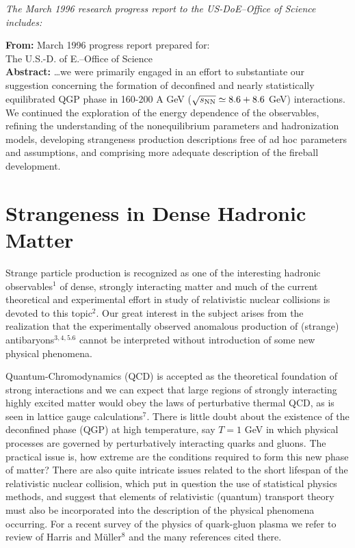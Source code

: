 \noindent\textit{The March 1996 research progress report to the  US-DoE--Office of Science includes:}\\[-0.7cm]
%
\begin{mdframed}[linecolor=gray,roundcorner=12pt,backgroundcolor=Dandelion!15,linewidth=1pt,leftmargin=0cm,rightmargin=0cm,topline=true,bottomline=true,skipabove=12pt]\relax%
%
{\large \textbf{From:} March 1996 progress report prepared for:}\\ 
\indent\indent\indent  The U.S.-D. of E.--Office of Science\\
\textbf{Abstract:} \ldots we were primarily  engaged in an effort to substantiate our suggestion concerning the  formation of deconfined and nearly statistically equilibrated QGP phase in 160-200 A GeV  ($\sqrt{s_{\rm NN}}\simeq 8.6 + 8.6$ GeV) interactions. We continued the exploration of the energy dependence of the observables, refining the understanding of the nonequilibrium parameters and hadronization models, developing strangeness production descriptions free of ad hoc parameters and assumptions, and comprising more adequate  description of the fireball development. 
% 
\section*{Strangeness in Dense Hadronic Matter} 
Strange particle production is  recognized as one of the interesting hadronic observables$^1$ of dense, strongly interacting matter and much of the current theoretical and experimental effort in study of relativistic nuclear collisions is devoted to  this topic$^2$. Our great interest in the subject arises from the realization that the experimentally observed anomalous production of (strange) antibaryons$^{3,4,5.6}$ cannot be interpreted without introduction of some new physical phenomena. 

Quantum-Chromodynamics (QCD) is accepted as the theoretical foundation of strong interactions and we can expect that large regions of strongly interacting highly excited matter would obey the laws of perturbative thermal QCD, as is seen in lattice gauge calculations$^7$. There is little doubt about the existence of the deconfined phase (QGP) at high temperature, say  $T=1$ GeV in which physical processes are governed by perturbatively interacting quarks and gluons. The practical issue is, how extreme are the conditions required to form this new phase of matter? There are also quite intricate issues related to the short lifespan of the relativistic nuclear collision, which put in question the use of statistical physics methods, and suggest that elements of relativistic (quantum) transport theory must also be incorporated into the description of the physical phenomena occurring. For a recent survey of the physics of quark-gluon plasma we refer to review of Harris and M\"uller$^{8}$  and the many references cited there.
 

\end{mdframed}
